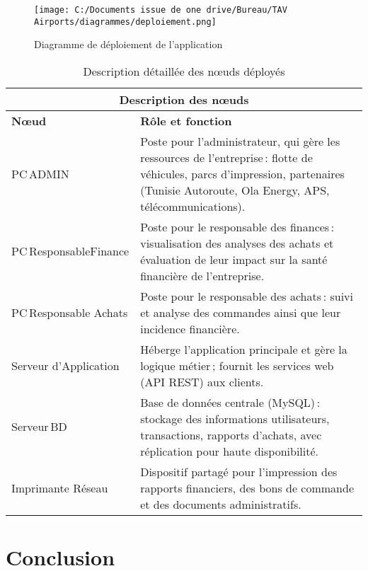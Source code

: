 \documentclass[a4paper,11pt]{report}
\begin{document}
\begin{figure}[H]
  \centering
  \texttt{[image: C:/Documents issue de one drive/Bureau/TAV Airports/diagrammes/deploiement.png]}
  \caption{Diagramme de déploiement de l’application}
  \label{fig:deployment}
\end{figure}

\vspace{1em}

\begin{table}[H]
  \centering
  \label{tab:description-noeuds}
  \begin{tabular}{@{}p{4cm}p{9.5cm}@{}}
    \toprule
    \multicolumn{2}{c}{\textbf{Description des nœuds}} \\ 
    \midrule
    \textbf{Nœud}            & \textbf{Rôle et fonction} \\ 
    \midrule
    PC ADMIN                 & Poste pour l’administrateur, qui gère les ressources de l’entreprise : flotte de véhicules, parcs d’impression, partenaires (Tunisie Autoroute, Ola Energy, APS, télécommunications). \\[4pt]
    PC ResponsableFinance   & Poste pour le responsable des finances : visualisation des analyses des achats et évaluation de leur impact sur la santé financière de l’entreprise. \\[4pt]
    PC Responsable Achats    & Poste pour le responsable des achats : suivi et analyse des commandes ainsi que leur incidence financière. \\[4pt]
    Serveur d’Application     & Héberge l’application principale et gère la logique métier ; fournit les services web (API REST) aux clients. \\[4pt]
    Serveur BD                & Base de données centrale (MySQL) : stockage des informations utilisateurs, transactions, rapports d’achats, avec réplication pour haute disponibilité. \\[4pt]
    Imprimante Réseau         & Dispositif partagé pour l’impression des rapports financiers, des bons de commande et des documents administratifs. \\ 
    \bottomrule
  \end{tabular}
    \caption{Description détaillée des nœuds déployés}

\end{table}

\section{Conclusion}
\end{document}
